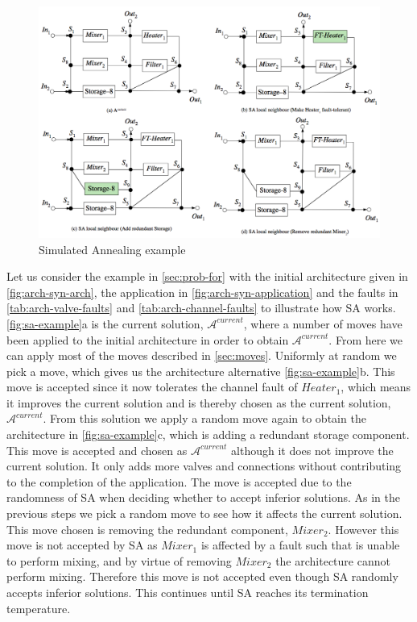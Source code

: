 \begin{figure}[H]
\centering
\includegraphics[width=\textwidth]{figures/SA-example.png}
\caption[Simulated Annealing example]{Simulated Annealing example}
\label{fig:sa-example}
\end{figure}

Let us consider the example in \autoref{sec:prob-for} with the initial architecture given in \autoref{fig:arch-syn-arch}, the application in \autoref{fig:arch-syn-application} and the faults in \autoref{tab:arch-valve-faults} and \autoref{tab:arch-channel-faults} to illustrate how SA works. \autoref{fig:sa-example}a is the current solution, $\mathcal{A}^{current}$, where a number of moves have been applied to the initial architecture in order to obtain $\mathcal{A}^{current}$. From here we can apply most of the moves described in \autoref{sec:moves}. Uniformly at random we pick a move, which gives us the architecture alternative \autoref{fig:sa-example}b. This move is accepted since it now tolerates the channel fault of $Heater_1$, which means it improves the current solution and is thereby chosen as the current solution, $\mathcal{A}^{current}$. From this solution we apply a random move again to obtain the architecture in \autoref{fig:sa-example}c, which is adding a redundant storage component. This move is accepted and chosen as $\mathcal{A}^{current}$ although it does not improve the current solution. It only adds more valves and connections without contributing to the completion of the application. The move is accepted due to the randomness of SA when deciding whether to accept inferior solutions. As in the previous steps we pick a random move to see how it affects the current solution. This move chosen is removing the redundant component, $Mixer_2$. However this move is not accepted by SA as $Mixer_1$ is affected by a fault such that is unable to perform mixing, and by virtue of removing $Mixer_2$ the architecture cannot perform mixing. Therefore this move is not accepted even though SA randomly accepts inferior solutions. This continues until SA reaches its termination temperature.

